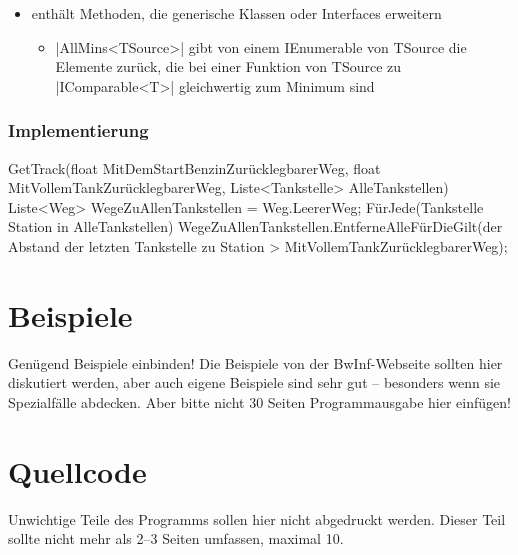 \documentclass[a4paper,10pt,ngerman]{scrartcl}
\begin{document}
    

    \begin{itemize}
        \item enthält Methoden, die generische Klassen oder Interfaces erweitern
        \begin{itemize}
            \item |AllMins<TSource>| gibt von einem IEnumerable von TSource die Elemente zurück, die bei einer Funktion von TSource zu |IComparable<T>| gleichwertig zum Minimum sind
        \end{itemize}
    \end{itemize}

\subsubsection{Implementierung}
\begin{lstcs}
GetTrack(float MitDemStartBenzinZurücklegbarerWeg, float MitVollemTankZurücklegbarerWeg, Liste<Tankstelle> AlleTankstellen)
{
	Liste<Weg> WegeZuAllenTankstellen = Weg.LeererWeg;
	FürJede(Tankstelle Station in AlleTankstellen)
	{
		WegeZuAllenTankstellen.EntferneAlleFürDieGilt(der Abstand der letzten Tankstelle zu Station > MitVollemTankZurücklegbarerWeg);
	}
}
\end{lstcs}
\section{Beispiele}

Genügend Beispiele einbinden! Die Beispiele von der BwInf-Webseite sollten hier diskutiert werden, aber auch eigene Beispiele sind sehr gut – besonders wenn sie Spezialfälle abdecken. Aber bitte nicht 30 Seiten Programmausgabe hier einfügen!

\section{Quellcode}
Unwichtige Teile des Programms sollen hier nicht abgedruckt werden. Dieser Teil sollte nicht mehr als 2–3 Seiten umfassen, maximal 10.
\end{document}
